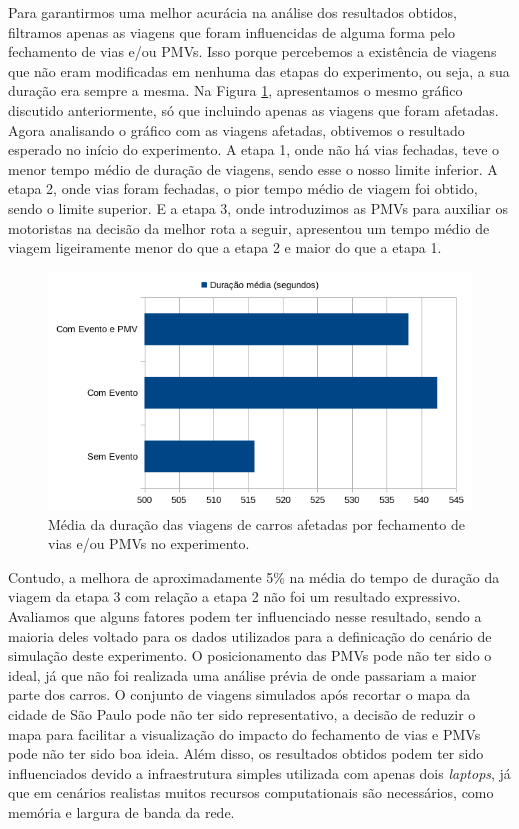 Para garantirmos uma melhor acurácia na análise dos resultados obtidos, filtramos apenas as viagens que foram influencidas de alguma forma pelo fechamento de vias e/ou PMVs.
Isso porque percebemos a existência de viagens que não eram modificadas em nenhuma das etapas do experimento, ou seja, a sua duração era sempre a mesma.
Na Figura \ref{fig:duracao_filtered}, apresentamos o mesmo gráfico discutido anteriormente, só que incluindo apenas as viagens que foram afetadas.
Agora analisando o gráfico com as viagens afetadas, obtivemos o resultado esperado no início do experimento.
A etapa 1, onde não há vias fechadas, teve o menor tempo médio de duração de viagens, sendo esse o nosso limite inferior.
A etapa 2, onde vias foram fechadas, o pior tempo médio de viagem foi obtido, sendo o limite superior.
E a etapa 3, onde introduzimos as PMVs para auxiliar os motoristas na decisão da melhor rota a seguir, apresentou um tempo médio de viagem ligeiramente menor do que a etapa 2 e maior do que a etapa 1.

\begin{figure}[ht]
	\centering
	\includegraphics[width=\textwidth]{figuras/duracao_filtered.png}
	\caption{Média da duração das viagens de carros afetadas por fechamento de vias e/ou PMVs no experimento.}
	\label{fig:duracao_filtered}
\end{figure}

Contudo, a melhora de aproximadamente 5\% na média do tempo de duração da viagem da etapa 3 com relação a etapa 2 não foi um resultado expressivo.
Avaliamos que alguns fatores podem ter influenciado nesse resultado, sendo a maioria deles voltado para os dados utilizados para a definicação do cenário de simulação deste experimento.
O posicionamento das PMVs pode não ter sido o ideal, já que não foi realizada uma análise prévia de onde passariam a maior parte dos carros.
O conjunto de viagens simulados após recortar o mapa da cidade de São Paulo pode não ter sido representativo, a decisão de reduzir o mapa para facilitar a visualização do impacto do fechamento de vias
e PMVs pode não ter sido boa ideia.
Além disso, os resultados obtidos podem ter sido influenciados devido a infraestrutura simples utilizada com apenas dois \textit{laptops}, já que em cenários realistas muitos recursos computationais são
necessários, como memória e largura de banda da rede.


